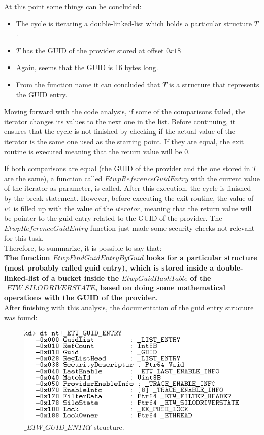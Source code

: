   At this point some things can be concluded:
  \begin{itemize}
  \setlength\itemsep{0.05em}
  \item The cycle is iterating a double-linked-list which holds a particular structure $T$.
  \item $T$ has the GUID of the provider stored at offset $0x18$
  \item Again, seems that the GUID is 16 bytes long.
  \item From the function name it can concluded that $T$ is a structure that represents the GUID entry.
  \end{itemize}

  Moving forward with the code analysis, if some of the comparisons failed, the iterator changes its values to the next one in the list. Before continuing, it ensures that the cycle is not finished by checking if the actual value of the iterator is the same one used as the starting point. If they are equal, the exit routine is executed meaning that the return value will be 0.

  If both comparisons are equal (the GUID of the provider and the one stored in $T$ are the same), a function called $EtwpReferenceGuidEntry$ with the current value of the iterator as parameter, is called. After this execution, the cycle is finished by the break statement. However, before executing the exit routine, the value of $v4$ is filled up with the value of the $iterator$, meaning that the return value will be pointer to the guid entry related to the GUID of the provider. The $EtwpReferenceGuidEntry$ function just made some security checks not relevant for this task. \\

  Therefore, to summarize, it is possible to say that:\\
  {\bfseries The function $EtwpFindGuidEntryByGuid$ looks for a particular structure (most probably called guid entry), which is stored inside a double-linked-list of a bucket inside the $EtwpGuidHashTable$ of the $\_ETW\_SILODRIVERSTATE$, based on doing some mathematical operations with the GUID of the provider.}\\


  After finishing with this analysis, the documentation of the guid entry structure was found: 

  \begin{centering}
    \begin{figure}[H]
      \includegraphics[width=12cm]{images/etwguidentrylayout.png}
      \caption[]{$\_ETW\_GUID\_ENTRY$ structure.}
      \label{fig:etwguidentrylayout}
    \end{figure}
  \end{centering}

